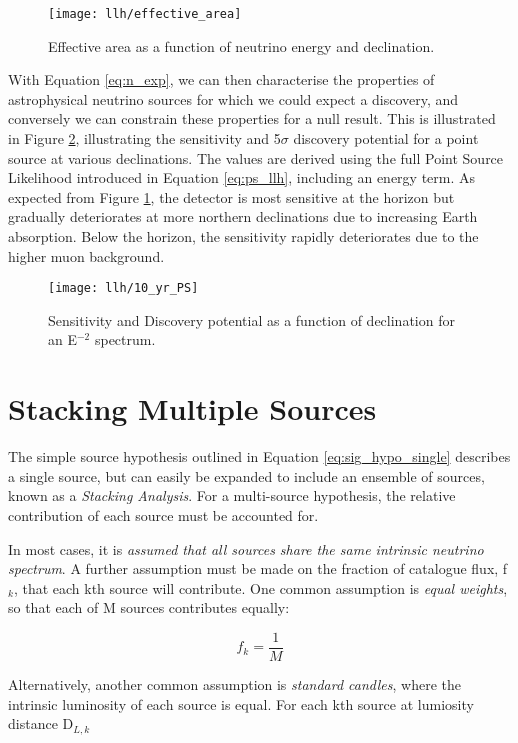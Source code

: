 \begin{figure}[!ht]
	\centering \texttt{[image: llh/effective\_area]}
	\caption{Effective area as a function of neutrino energy and declination.}
	\label{fig:effective_area}
\end{figure}

With Equation \ref{eq:n_exp}, we can then characterise the properties of astrophysical neutrino sources for which we could expect a discovery, and conversely we can constrain these properties for a null result. This is illustrated in Figure \ref{fig:10yr_ps}, illustrating the sensitivity and 5$\sigma$ discovery potential for a point source at various declinations. The values are derived using the full Point Source Likelihood introduced in Equation \ref{eq:ps_llh}, including an energy term. As expected from Figure \ref{fig:effective_area}, the detector is most sensitive at the horizon but gradually deteriorates at more northern declinations due to increasing Earth absorption. Below the horizon, the sensitivity rapidly deteriorates due to the higher muon background.

\begin{figure}[!ht]
	\centering \texttt{[image: llh/10\_yr\_PS]}
	\caption{Sensitivity and Discovery potential as a function of declination for an E$^{-2}$ spectrum.}
	\label{fig:10yr_ps}
\end{figure}

\section{Stacking Multiple Sources}

The simple source hypothesis outlined in Equation \ref{eq:sig_hypo_single} describes a single source, but can easily be expanded to include an ensemble of sources, known as a \emph{Stacking Analysis}. For a multi-source hypothesis, the relative contribution of each source must be accounted for.

In most cases, it is \emph{assumed that all sources share the same intrinsic neutrino spectrum}. A further assumption must be made on the fraction of catalogue flux, f$_{k}$, that each kth source will contribute. One common assumption is \emph{equal weights}, so that each of M sources contributes equally:

\begin{equation}
f_{k} = \frac{1}{M}
\end{equation}

Alternatively, another common assumption is \emph{standard candles}, where the intrinsic luminosity of each source is equal. For each kth source at lumiosity distance D$_{L,k}$

